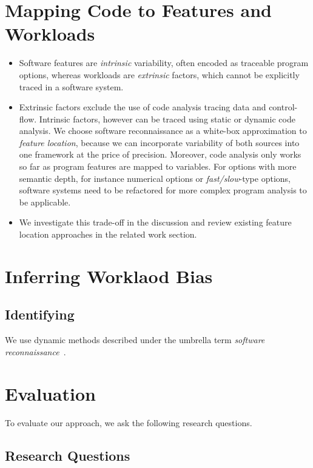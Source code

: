\documentclass[conference]{IEEEtran}
\begin{document}
\section{Mapping Code to Features and Workloads}\label{sec:mapping}
\begin{itemize}
	\item Software features are \emph{intrinsic} variability, often encoded as traceable program options, whereas workloads are \emph{extrinsic} factors, which cannot be explicitly traced in a software system.
	\item Extrinsic factors exclude the use of code analysis tracing data and control-flow. Intrinsic factors, however can be traced using static or dynamic code analysis. 
	We choose software reconnaissance as a white-box approximation to \emph{feature location}, because we can incorporate variability of both sources into one framework at the price of precision. Moreover, code analysis only works so far as program features are mapped to variables. For options with more semantic depth, for instance numerical options or \emph{fast/slow}-type options, software systems need to be refactored for more complex program analysis to be applicable.
	\item We investigate this trade-off in the discussion and review existing feature location approaches in the related work section.
\end{itemize}


\section{Inferring Worklaod Bias}
\subsection{Identifying }
We use dynamic methods described under the umbrella term \emph{software reconnaissance}~\cite{wilde_reconnaissance_1995}.



\section{Evaluation}
To evaluate our approach, we ask the following research questions.

\subsection{Research Questions}
\end{document}
